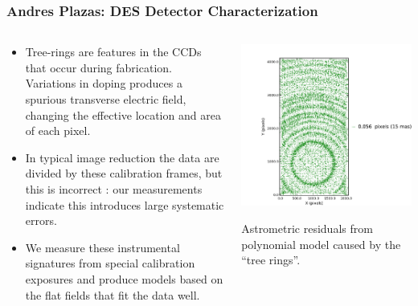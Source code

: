 \documentclass{beamer}
\begin{document}
{
    \frametitle{Andres Plazas: DES Detector Characterization}

    \fontsize{8}{0.7\baselineskip}
    \begin{columns}
        \begin{column}{0.4\textwidth}
            \begin{itemize}

                \item Tree-rings are features in the CCDs that occur during
                    fabrication.  Variations in doping produces a spurious
                    transverse electric field, changing the effective location
                    and area of each pixel.

                \item In typical image reduction the data are divided by these
                    calibration frames, but this is incorrect : our
                    measurements indicate this introduces large systematic
                    errors.

                \item We measure these instrumental signatures from special
                    calibration exposures and produce models based on the flat
                    fields that fit the data well.

            \end{itemize}
        \end{column}
        \begin{column}{0.6\textwidth}
            \includegraphics[width=\textwidth]{N22_astrometric_single-crop.pdf}
            \newline

            {\tiny Astrometric residuals from polynomial model caused by
            the ``tree rings''. \par}


        \end{column}
    \end{columns}


}
\end{document}
